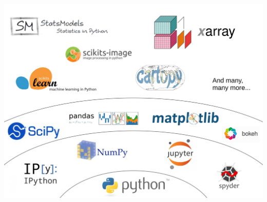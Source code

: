 \documentclass[10pt, compress]{beamer}
\begin{document}
\begin{frame}
  \includegraphics[width=\textwidth]{images/scipy_ecosystem.png}
\end{frame}
\end{document}
